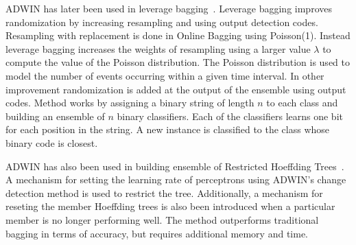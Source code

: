 ADWIN has later been used in leverage bagging~\cite{bifet10:levbag}. Leverage bagging improves randomization by increasing resampling and using output detection codes. Resampling with replacement is done in Online Bagging using Poisson(1). Instead leverage bagging increases the weights of resampling using a larger value $\lambda$ to compute the value of the Poisson distribution. The Poisson distribution is used to model the number of events occurring within a given time interval. In other improvement randomization is added at the output of the ensemble using output codes. Method works by assigning a binary string of length $n$ to each class and building an ensemble of $n$ binary classifiers. Each of the classifiers learns one bit for each position in the string. A new instance is classified to the class whose binary code is closest. 

ADWIN has also been used in building ensemble of Restricted Hoeffding Trees~\cite{bifet10:rht}. A mechanism for setting the learning rate of perceptrons using ADWIN's change detection method is used to restrict the tree. Additionally, a mechanism for reseting the member Hoeffding trees is also been introduced when a particular member is no longer performing well. The method outperforms traditional bagging in terms of accuracy, but requires additional memory and time.
